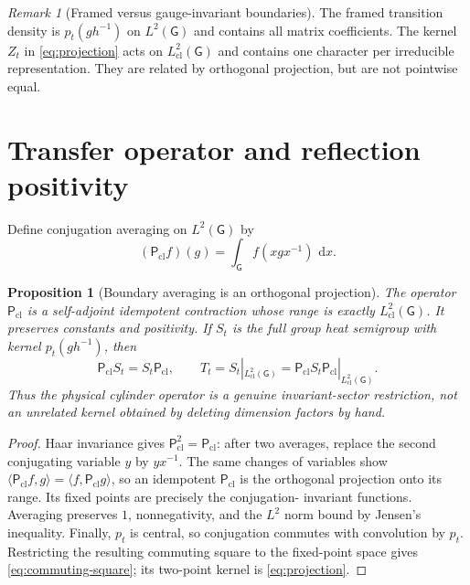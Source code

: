 \documentclass[11pt]{article}
\newtheorem{proposition}[theorem]{Proposition}
\theoremstyle{remark}
\newtheorem{remark}[theorem]{Remark}
\newcommand{\G}{\mathsf G}
\newcommand{\dd}{\,\mathrm d}
\newcommand{\HclG}{L^2_{\mathrm{cl}}(\G)}
\newcommand{\Pcl}{\mathsf P_{\mathrm{cl}}}
\newcommand{\ip}[2]{\langle #1,#2\rangle}
\begin{document}
\begin{remark}[Framed versus gauge-invariant boundaries]
The framed transition density is $p_t(gh^{-1})$ on $L^2(\G)$ and contains all
matrix coefficients.  The kernel $Z_t$ in \eqref{eq:projection} acts on
$\HclG$ and contains one character per irreducible representation.  They are
related by orthogonal projection, but are not pointwise equal.
\end{remark}

\section{Transfer operator and reflection positivity}

Define conjugation averaging on $L^2(\G)$ by
\begin{equation}\label{eq:class-projection}
 (\Pcl f)(g)=\int_\G f(xgx^{-1})\,\dd x.
\end{equation}

\begin{proposition}[Boundary averaging is an orthogonal projection]
\label{prop:conditional-expectation}
The operator $\Pcl$ is a self-adjoint idempotent contraction whose range is
exactly $\HclG$.  It preserves constants and positivity.  If $S_t$ is the full
group heat semigroup with kernel $p_t(gh^{-1})$, then
\begin{equation}\label{eq:commuting-square}
 \Pcl S_t=S_t\Pcl,\qquad
 T_t=S_t|_{\HclG}=\Pcl S_t\Pcl|_{\HclG}.
\end{equation}
Thus the physical cylinder operator is a genuine invariant-sector restriction,
not an unrelated kernel obtained by deleting dimension factors by hand.
\end{proposition}

\begin{proof}
Haar invariance gives $\Pcl^2=\Pcl$: after two averages, replace the second
conjugating variable $y$ by $yx^{-1}$.  The same changes of variables show
$\ip{\Pcl f}{g}=\ip{f}{\Pcl g}$, so an idempotent $\Pcl$ is the orthogonal
projection onto its range.  Its fixed points are precisely the conjugation-
invariant functions.  Averaging preserves $1$, nonnegativity, and the
$L^2$ norm bound by Jensen's inequality.  Finally, $p_t$ is central, so
conjugation commutes with convolution by $p_t$.  Restricting the resulting
commuting square to the fixed-point space gives \eqref{eq:commuting-square};
its two-point kernel is \eqref{eq:projection}.
\end{proof}
\end{document}
